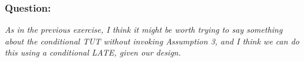 \documentclass[oneside,11pt]{article}
\begin{document}
\subsubsection{Question:}
\textit{As in the previous exercise, I think it might be worth trying to say something about the conditional TUT without invoking Assumption 3, and I think we can do this using a conditional LATE, given our design.}


\newpage
\clearpage

\begin{landscape}
\begin{table}[H]
\caption{}
\label{}
\begin{center}
\resizebox{1.5\textwidth}{!}{
\scriptsize{}
}
\end{center}

\end{table}

\end{landscape}
\end{document}
